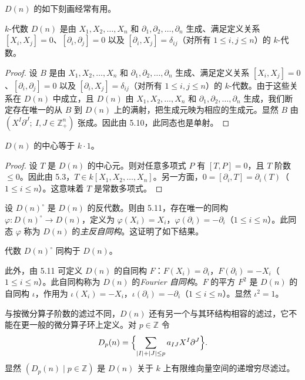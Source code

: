 $D(n)$ 的如下刻画经常有用。

\begin{theorem}
$k$-代数 $D(n)$ 是由 $X_1,X_2,\dots,X_n$ 和 $\partial_1,\partial_2,\dots,\partial_n$ 生成、满足定义关系 $[X_i,X_j]=0$、$[\partial_i,\partial_j]=0$ 以及 $[\partial_i,X_j]=\delta_{ij}$（对所有 $1\le i,j\le n$）的 $k$-代数。
\end{theorem}

\begin{proof}
设 $B$ 是由 $X_1,X_2,\dots,X_n$ 和 $\partial_1,\partial_2,\dots,\partial_n$ 生成、满足定义关系 $[X_i,X_j]=0$、$[\partial_i,\partial_j]=0$ 以及 $[\partial_i,X_j]=\delta_{ij}$（对所有 $1\le i,j\le n$）的 $k$-代数。由于这些关系在 $D(n)$ 中成立，且 $D(n)$ 由 $X_1,X_2,\dots,X_n$ 和 $\partial_1,\partial_2,\dots,\partial_n$ 生成，我们断定存在唯一的从 $B$ 到 $D(n)$ 上的满射，把生成元映为相应的生成元。显然 $B$ 由 $(X^I\partial^J;\ I,J\in\mathbb{Z}_+^n)$ 张成。因此由 5.10，此同态也是单射。
\end{proof}

\begin{proposition}
$D(n)$ 的中心等于 $k\cdot 1$。
\end{proposition}

\begin{proof}
设 $T$ 是 $D(n)$ 的中心元。则对任意多项式 $P$ 有 $[T,P]=0$，且 $T$ 阶数 $\le 0$。因此由 5.3，$T\in k[X_1,X_2,\dots,X_n]$。另一方面，$0=[\partial_i,T]=\partial_i(T)$（$1\le i\le n$）。这意味着 $T$ 是常数多项式。
\end{proof}

设 $D(n)^\circ$ 是 $D(n)$ 的反代数。则由 5.11，存在唯一的同构 $\varphi:D(n)^\circ\to D(n)$，定义为 $\varphi(X_i)=X_i$，$\varphi(\partial_i)=-\partial_i$（$1\le i\le n$）。此同态 $\varphi$ 称为 $D(n)$ 的\emph{主反自同构}。这证明了如下结果。

\begin{proposition}
代数 $D(n)^\circ$ 同构于 $D(n)$。
\end{proposition}

此外，由 5.11 可定义 $D(n)$ 的自同构 $F$：$F(X_i)=\partial_i$，$F(\partial_i)=-X_i$（$1\le i\le n$）。此自同构称为 $D(n)$ 的\emph{Fourier 自同构}。$F$ 的平方 $F^2$ 是 $D(n)$ 的自同构 $\iota$，作用为 $\iota(X_i)=-X_i$，$\iota(\partial_i)=-\partial_i$（$1\le i\le n$）。显然 $\iota^2=1$。

与按微分算子阶数的滤过不同，$D(n)$ 还有另一个与其环结构相容的滤过，它不能在更一般的微分算子环上定义。对 $p\in\mathbb{Z}$ 令
$$D_p(n)=\Bigl\{\sum_{|I|+|J|\le p}a_{IJ}X^I\partial^J\Bigr\}.$$
显然 $(D_p(n)\mid p\in\mathbb{Z})$ 是 $D(n)$ 关于 $k$ 上有限维向量空间的递增穷尽滤过。

